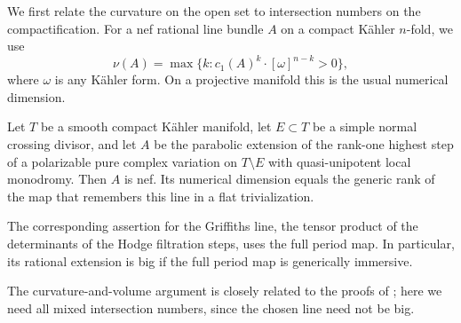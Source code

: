 We first relate the curvature on the open set to intersection numbers
on the compactification.  For a nef rational line bundle $A$ on a compact
Kähler $n$-fold, we use
\[
 \nu(A)=\max\{k:c_1(A)^k\cdot[\omega]^{n-k}>0\},
\]
where $\omega$ is any Kähler form.  On a projective manifold this is
the usual numerical dimension.

\begin{lemma}
\label{period:numerics}
Let $T$ be a smooth compact Kähler manifold, let $E\subset T$ be a
simple normal crossing divisor, and let $A$ be the parabolic extension
of the rank-one highest step of a polarizable pure complex variation on
$T\setminus E$ with quasi-unipotent local monodromy.  Then $A$ is nef.
Its numerical dimension equals the generic rank of the map that
remembers this line in a flat trivialization.

The corresponding assertion for the Griffiths line, the tensor product
of the determinants of the Hodge filtration steps, uses the full period
map.  In particular, its rational extension is big if the full period
map is generically immersive.
\end{lemma}

The curvature-and-volume argument is closely related to the proofs of
\cite[Lemmas~6.15 and~6.17]{BakkerBrunebarbeTsimerman}; here we need
all mixed intersection numbers, since the chosen line need not be big.

